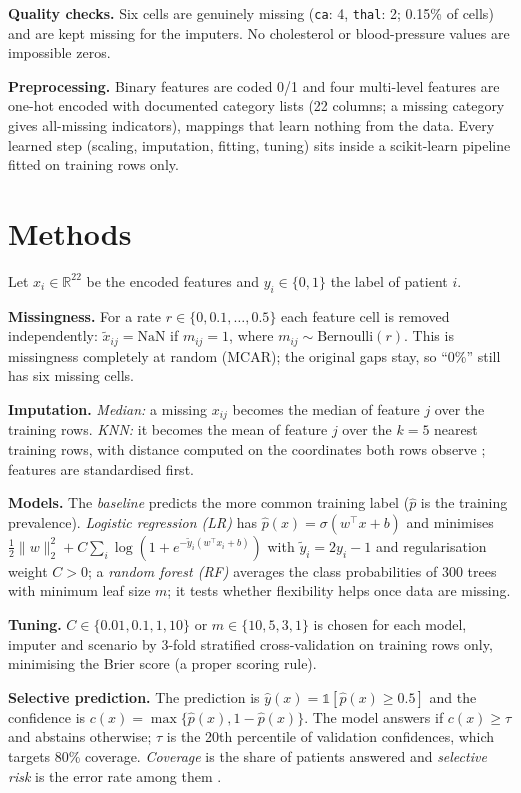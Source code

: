 \documentclass{article}
\begin{document}
\textbf{Quality checks.} Six cells are genuinely missing (\texttt{ca}: 4, \texttt{thal}: 2; 0.15\% of cells) and are kept missing for the imputers. No cholesterol or blood-pressure values are impossible zeros.

\textbf{Preprocessing.} Binary features are coded 0/1 and four multi-level features are one-hot encoded with documented category lists (22 columns; a missing category gives all-missing indicators), mappings that learn nothing from the data. Every learned step (scaling, imputation, fitting, tuning) sits inside a scikit-learn pipeline \citep{pedregosa2011} fitted on training rows only.

\section{Methods}
Let $x_i\in\mathbb{R}^{22}$ be the encoded features and $y_i\in\{0,1\}$ the label of patient $i$.

\textbf{Missingness.} For a rate $r\in\{0,0.1,\dots,0.5\}$ each feature cell is removed independently: $\tilde x_{ij}=\mathrm{NaN}$ if $m_{ij}=1$, where $m_{ij}\sim\mathrm{Bernoulli}(r)$. This is missingness completely at random (MCAR); the original gaps stay, so ``0\%'' still has six missing cells.

\textbf{Imputation.} \emph{Median:} a missing $x_{ij}$ becomes the median of feature $j$ over the training rows. \emph{KNN:} it becomes the mean of feature $j$ over the $k=5$ nearest training rows, with distance computed on the coordinates both rows observe \citep{troyanskaya2001}; features are standardised first.

\textbf{Models.} The \emph{baseline} predicts the more common training label ($\hat p$ is the training prevalence). \emph{Logistic regression (LR)} has $\hat p(x)=\sigma(w^\top x+b)$ and minimises $\tfrac12\|w\|_2^2+C\sum_i\log(1+e^{-\tilde y_i(w^\top x_i+b)})$ with $\tilde y_i=2y_i-1$ and regularisation weight $C>0$; a \emph{random forest (RF)} averages the class probabilities of 300 trees \citep{breiman2001} with minimum leaf size $m$; it tests whether flexibility helps once data are missing.

\textbf{Tuning.} $C\in\{0.01,0.1,1,10\}$ or $m\in\{10,5,3,1\}$ is chosen for each model, imputer and scenario by 3-fold stratified cross-validation on training rows only, minimising the Brier score (a proper scoring rule).

\textbf{Selective prediction.} The prediction is $\hat y(x)=\mathbb{1}[\hat p(x)\ge 0.5]$ and the confidence is $c(x)=\max\{\hat p(x),1-\hat p(x)\}$. The model answers if $c(x)\ge\tau$ and abstains otherwise; $\tau$ is the 20th percentile of validation confidences, which targets 80\% coverage. \emph{Coverage} is the share of patients answered and \emph{selective risk} is the error rate among them \citep{elyaniv2010}.
\end{document}
